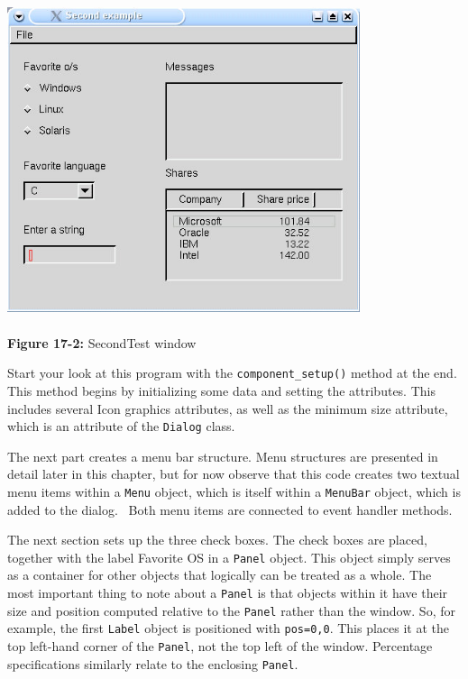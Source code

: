 \begin{center}
\includegraphics[width=4.0756in,height=3.6465in]{ub-img/ub-img51.jpg}
\end{center}

{\sffamily\bfseries Figure 17-2:}
{\sffamily SecondTest window}

\bigskip

Start your look at this program with the \texttt{component\_setup()}
method at the end. This method begins by initializing some data and
setting the attributes. This includes several Icon graphics attributes,
as well as the minimum size attribute, which is an attribute of the
\texttt{Dialog} class.

The next part creates a menu bar structure.
Menu structures are presented in detail later in this chapter, but for
now observe that this code creates two textual menu items within a
\texttt{Menu} object, which is itself within a \texttt{MenuBar} object,
which is added to the dialog. \ Both menu items are connected to event
handler methods.

The next section sets up the three check boxes. The
check boxes are placed, together with the label {\textquotedbl}Favorite
OS{\textquotedbl} in a \texttt{Panel} object. This object simply
serves as a container for other objects that logically can be treated
as a whole. The most important thing to note about a \texttt{Panel} is
that objects within it have their size and position computed relative
to the \texttt{Panel} rather than the window. So, for example, the
first \texttt{Label} object is positioned with
\texttt{{\textquotedbl}pos=0,0{\textquotedbl}}. This places it at the
top left-hand corner of the \texttt{Panel}, not the top left of the
window. Percentage specifications similarly relate to the enclosing
\texttt{Panel}.

